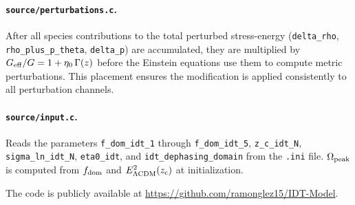 \documentclass[aps,prd,twocolumn,superscriptaddress,nofootinbib]{revtex4-2}
\newcommand{\fdom}{f_{\rm dom}}
\newcommand{\zc}{z_{\rm c}}
\newcommand{\Geff}{G_{\rm eff}}
\begin{document}
\paragraph{\texttt{source/perturbations.c}.}
After all species contributions to the total perturbed
stress-energy (\texttt{delta\_rho}, \texttt{rho\_plus\_p\_theta},
\texttt{delta\_p}) are accumulated, they are multiplied by
$\Geff/G = 1 + \eta_0\,\Gamma(z)$ before the Einstein equations
use them to compute metric perturbations. This placement ensures
the modification is applied consistently to all perturbation
channels.

\paragraph{\texttt{source/input.c}.}
Reads the parameters \texttt{f\_dom\_idt\_1} through
\texttt{f\_dom\_idt\_5}, \texttt{z\_c\_idt\_N},
\texttt{sigma\_ln\_idt\_N}, \texttt{eta0\_idt}, and
\texttt{idt\_dephasing\_domain} from the \texttt{.ini} file.
$\Omega_{\rm peak}$ is computed from $\fdom$ and
$E^2_{\Lambda{\rm CDM}}(\zc)$ at initialization.

The code is publicly available at
\url{https://github.com/ramonglez15/IDT-Model}.
\end{document}
